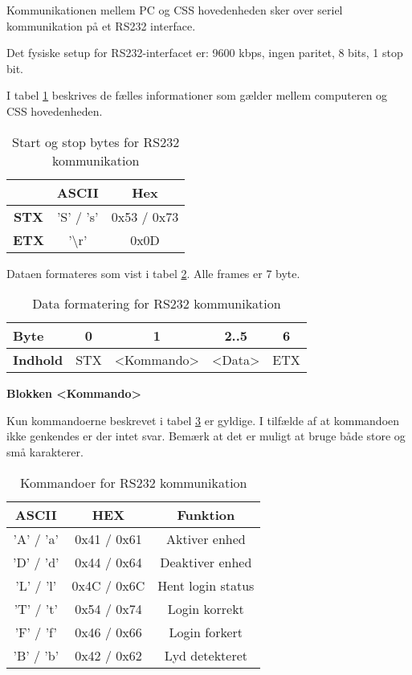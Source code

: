 Kommunikationen mellem PC og CSS hovedenheden sker over seriel kommunikation på et RS232 interface.

Det fysiske setup for RS232-interfacet er: 9600 kbps, ingen paritet, 8 bits, 1 stop bit.

I tabel \ref{table:RS232StartStopBytes} beskrives de fælles informationer som gælder mellem computeren og CSS hovedenheden.

\begin{table}[h]
	\caption{Start og stop bytes for RS232 kommunikation}
	\centering
	\begin{tabular}{|c|c|c|}
		\hline 
		& \textbf{ASCII} & \textbf{Hex} \\ 
		\hline 
		\textbf{STX} & 'S' / 's' & 0x53 / 0x73 \\ 
		\hline 
		\textbf{ETX} & '\textbackslash r' & 0x0D \\ 
		\hline 
	\end{tabular} 
	\label{table:RS232StartStopBytes}
\end{table}


Dataen formateres som vist i tabel \ref{table:RS232DataFormat}. Alle frames er 7 byte.

\begin{table}[h]
	\caption{Data formatering for RS232 kommunikation}
	\centering
	\begin{tabular}{|l|c|c|c|c|}
		\hline 
		\textbf{Byte} & 0 & 1 & 2..5 & 6 \\ 
		\hline 
		\textbf{Indhold} & STX & <Kommando> & <Data> & ETX \\ 
		\hline 
	\end{tabular} 
	\label{table:RS232DataFormat}
\end{table}

\textbf{Blokken <Kommando>}

Kun kommandoerne beskrevet i tabel \ref{tabel:RS232Kommandoer} er gyldige. I tilfælde af at kommandoen ikke genkendes er der intet svar. Bemærk at det er muligt at bruge både store og små karakterer.

\begin{table}[h]
\caption{Kommandoer for RS232 kommunikation}
\centering
\begin{tabular}{|c|c|c|}
\hline 
\textbf{ASCII} & \textbf{HEX} & \textbf{Funktion} \\ 
\hline 
'A' / 'a' & 0x41 / 0x61 & Aktiver enhed \\ 
\hline 
'D' / 'd' & 0x44 / 0x64 & Deaktiver enhed \\ 
\hline 
'L' / 'l' & 0x4C / 0x6C & Hent login status \\ 
\hline 
'T' / 't' & 0x54 / 0x74 & Login korrekt \\ 
\hline 
'F' / 'f' & 0x46 / 0x66 & Login forkert \\ 
\hline
'B' / 'b' & 0x42 / 0x62 & Lyd detekteret \\ 
\hline
\end{tabular}
\label{tabel:RS232Kommandoer}
\end{table} 

